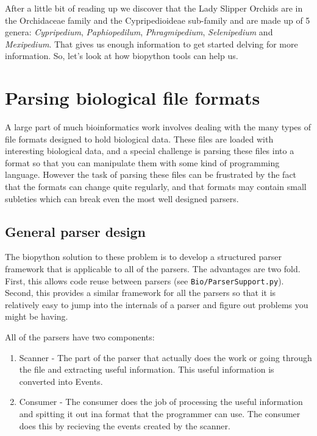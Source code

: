 \documentclass{report}
\begin{document}
After a little bit of reading up we discover that the Lady Slipper Orchids are in the Orchidaceae family and the Cypripedioideae sub-family and are made up of 5 genera:  \emph{Cypripedium}, \emph{Paphiopedilum}, \emph{Phragmipedium}, \emph{Selenipedium} and \emph{Mexipedium}. That gives us enough information to get started delving for more information. So, let's look at how biopython tools can help us.

\section{Parsing biological file formats}

A large part of much bioinformatics work involves dealing with the many types of file formats designed to hold biological data. These files are loaded with interesting biological data, and a special challenge is parsing these files into a format so that you can manipulate them with some kind of programming language. However the task of parsing these files can be frustrated by the fact that the formats can change quite regularly, and that formats may contain small subleties which can break even the most well designed parsers. 

\subsection{General parser design}

The biopython solution to these problem is to develop a structured parser framework that is applicable to all of the parsers. The advantages are two fold. First, this allows code reuse between parsers (see \verb|Bio/ParserSupport.py|). Second, this provides a similar framework for all the parsers so that it is relatively easy to jump into the internals of a parser and figure out problems you might be having. 


All of the parsers have two components:

\begin{enumerate}

\item Scanner - The part of the parser that actually does the work or going through the file and extracting useful information. This useful information is converted into Events.

\item Consumer - The consumer does the job of processing the useful information and spitting it out ina format that the programmer can use. The consumer does this by recieving the events created by the scanner.

\end{enumerate}
\end{document}
